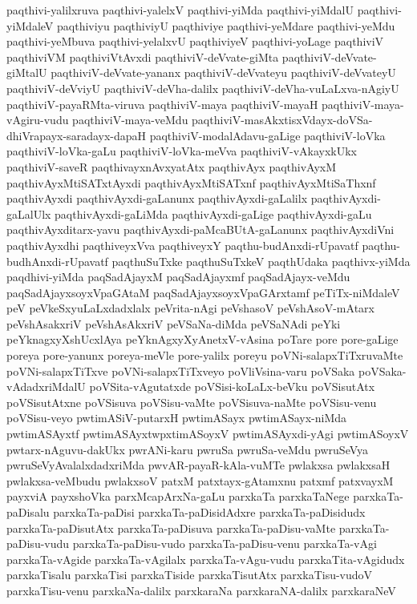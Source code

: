 {paqthivi-yalilxruva
paqthivi-yalelxV
paqthivi-yiMda
paqthivi-yiMdalU
paqthivi-yiMdaleV
paqthiviyu
paqthiviyU
paqthiviye
paqthivi-yeMdare
paqthivi-yeMdu
paqthivi-yeMbuva
paqthivi-yelalxvU
paqthiviyeV
paqthivi-yoLage
paqthiviV
paqthiviVM
paqthiviVtAvxdi
paqthiviV-deVvate-giMta
paqthiviV-deVvate-giMtalU
paqthiviV-deVvate-yananx
paqthiviV-deVvateyu
paqthiviV-deVvateyU
paqthiviV-deVviyU
paqthiviV-deVha-dalilx
paqthiviV-deVha-vuLaLxva-nAgiyU
paqthiviV-payaRMta-viruva
paqthiviV-maya
paqthiviV-mayaH
paqthiviV-maya-vAgiru-vudu
paqthiviV-maya-veMdu
paqthiviV-masAkxtisxVdayx-doVSa-dhiVrapayx-saradayx-dapaH
paqthiviV-modalAdavu-gaLige
paqthiviV-loVka
paqthiviV-loVka-gaLu
paqthiviV-loVka-meVva
paqthiviV-vAkayxkUkx
paqthiviV-saveR
paqthivayxnAvxyatAtx
paqthivAyx
paqthivAyxM
paqthivAyxMtiSATxtAyxdi
paqthivAyxMtiSATxnf
paqthivAyxMtiSaThxnf
paqthivAyxdi
paqthivAyxdi-gaLanunx
paqthivAyxdi-gaLalilx
paqthivAyxdi-gaLalUlx
paqthivAyxdi-gaLiMda
paqthivAyxdi-gaLige
paqthivAyxdi-gaLu
paqthivAyxditarx-yavu
paqthivAyxdi-paMcaBUtA-gaLanunx
paqthivAyxdiVni
paqthivAyxdhi
paqthiveyxVva
paqthiveyxY
paqthu-budAnxdi-rUpavatf
paqthu-budhAnxdi-rUpavatf
paqthuSuTxke
paqthuSuTxkeV
paqthUdaka
paqthivx-yiMda
paqdhivi-yiMda
paqSadAjayxM
paqSadAjayxmf
paqSadAjayx-veMdu
paqSadAjayxsoyxVpaGAtaM
paqSadAjayxsoyxVpaGArxtamf
peTiTx-niMdaleV
peV
peVkeSxyuLaLxdadxlalx
peVrita-nAgi
peVshasoV
peVshAsoV-mAtarx
peVshAsakxriV
peVshAsAkxriV
peVSaNa-diMda
peVSaNAdi
peYki
peYknagxyXshUcxlAya
peYknAgxyXyAnetxV-vAsina
poTare
pore
pore-gaLige
poreya
pore-yanunx
poreya-meVle
pore-yalilx
poreyu
poVNi-salapxTiTxruvaMte
poVNi-salapxTiTxve
poVNi-salapxTiTxveyo
poVliVsina-varu
poVSaka
poVSaka-vAdadxriMdalU
poVSita-vAgutatxde
poVSisi-koLaLx-beVku
poVSisutAtx
poVSisutAtxne
poVSisuva
poVSisu-vaMte
poVSisuva-naMte
poVSisu-venu
poVSisu-veyo
pwtimASiV-putarxH
pwtimASayx
pwtimASayx-niMda
pwtimASAyxtf
pwtimASAyxtwpxtimASoyxV
pwtimASAyxdi-yAgi
pwtimASoyxV
pwtarx-nAguvu-dakUkx
pwrANi-karu
pwruSa
pwruSa-veMdu
pwruSeVya
pwruSeVyAvalalxdadxriMda
pwvAR-payaR-kAla-vuMTe
pwlakxsa
pwlakxsaH
pwlakxsa-veMbudu
pwlakxsoV
patxM
patxtayx-gAtamxnu
patxmf
patxvayxM
payxviA
payxshoVka
parxMcapArxNa-gaLu
parxkaTa
parxkaTaNege
parxkaTa-paDisalu
parxkaTa-paDisi
parxkaTa-paDisidAdxre
parxkaTa-paDisidudx
parxkaTa-paDisutAtx
parxkaTa-paDisuva
parxkaTa-paDisu-vaMte
parxkaTa-paDisu-vudu
parxkaTa-paDisu-vudo
parxkaTa-paDisu-venu
parxkaTa-vAgi
parxkaTa-vAgide
parxkaTa-vAgilalx
parxkaTa-vAgu-vudu
parxkaTita-vAgidudx
parxkaTisalu
parxkaTisi
parxkaTiside
parxkaTisutAtx
parxkaTisu-vudoV
parxkaTisu-venu
parxkaNa-dalilx
parxkaraNa
parxkaraNA-dalilx
parxkaraNeV
}
